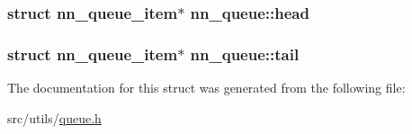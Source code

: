 \subsubsection[{head}]{\setlength{\rightskip}{0pt plus 5cm}struct {\bf nn\+\_\+queue\+\_\+item}$\ast$ nn\+\_\+queue\+::head}\hypertarget{structnn__queue_a3e9e8719559c09cbf465aba2f53f18cd}{}\label{structnn__queue_a3e9e8719559c09cbf465aba2f53f18cd}
\subsubsection[{tail}]{\setlength{\rightskip}{0pt plus 5cm}struct {\bf nn\+\_\+queue\+\_\+item}$\ast$ nn\+\_\+queue\+::tail}\hypertarget{structnn__queue_ae32a4da4bc53162492eba90840b5c106}{}\label{structnn__queue_ae32a4da4bc53162492eba90840b5c106}


The documentation for this struct was generated from the following file\+:\begin{DoxyCompactItemize}
\item 
src/utils/\hyperlink{queue_8h}{queue.\+h}\end{DoxyCompactItemize}
